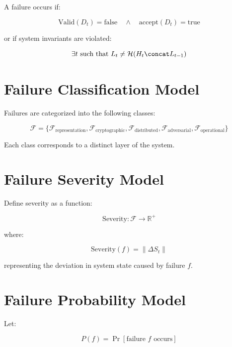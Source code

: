A failure occurs if:

\begin{equation}
\text{Valid}(D_t) = \text{false} \quad \land \quad \text{accept}(D_t) = \text{true}
\end{equation}

or if system invariants are violated:

\begin{equation}
\exists t \text{ such that } L_t \neq \mathcal{H}(H_t \concat L_{t-1})
\end{equation}

\section{Failure Classification Model}

Failures are categorized into the following classes:

\begin{equation}
\mathcal{F} = \{\mathcal{F}_{\text{representation}}, \mathcal{F}_{\text{cryptographic}}, \mathcal{F}_{\text{distributed}}, \mathcal{F}_{\text{adversarial}}, \mathcal{F}_{\text{operational}}\}
\end{equation}

Each class corresponds to a distinct layer of the system.

\section{Failure Severity Model}

Define severity as a function:

\begin{equation}
\text{Severity}: \mathcal{F} \rightarrow \mathbb{R}^+
\end{equation}

where:

\begin{equation}
\text{Severity}(f) = \|\Delta S_t\|
\end{equation}

representing the deviation in system state caused by failure $f$.

\section{Failure Probability Model}

Let:

\begin{equation}
P(f) = \Pr[\text{failure } f \text{ occurs}]
\end{equation}

